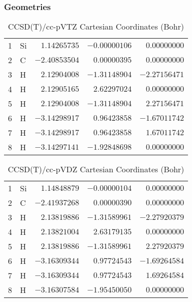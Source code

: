 \documentclass[10pt,oneside]{article}
\begin{document}
\clearpage

\subsection{\ \ \ }

\subsubsection*{Geometries}
\begin{table}[h!]
\centering
\caption{CCSD(T)/cc-pVTZ Cartesian Coordinates (Bohr)}
\begin{tabular}{llrrr}
1  & Si & $ 1.14265735$ & $-0.00000106$ & $ 0.00000000$ \\
2  & C  & $-2.40853504$ & $ 0.00000395$ & $ 0.00000000$ \\
3  & H  & $ 2.12904008$ & $-1.31148904$ & $-2.27156471$ \\
4  & H  & $ 2.12905165$ & $ 2.62297024$ & $ 0.00000000$ \\
5  & H  & $ 2.12904008$ & $-1.31148904$ & $ 2.27156471$ \\
6  & H  & $-3.14298917$ & $ 0.96423858$ & $-1.67011742$ \\
7  & H  & $-3.14298917$ & $ 0.96423858$ & $ 1.67011742$ \\
8  & H  & $-3.14297141$ & $-1.92848698$ & $ 0.00000000$ \\
\end{tabular}
\end{table}

\begin{table}[h!]
\centering
\caption{CCSD(T)/cc-pVDZ Cartesian Coordinates (Bohr)}
\begin{tabular}{llrrr}
1  & Si & $ 1.14848879$ & $-0.00000104$ & $ 0.00000000$ \\
2  & C  & $-2.41937268$ & $ 0.00000390$ & $ 0.00000000$ \\
3  & H  & $ 2.13819886$ & $-1.31589961$ & $-2.27920379$ \\
4  & H  & $ 2.13821004$ & $ 2.63179135$ & $ 0.00000000$ \\
5  & H  & $ 2.13819886$ & $-1.31589961$ & $ 2.27920379$ \\
6  & H  & $-3.16309344$ & $ 0.97724543$ & $-1.69264584$ \\
7  & H  & $-3.16309344$ & $ 0.97724543$ & $ 1.69264584$ \\
8  & H  & $-3.16307584$ & $-1.95450050$ & $ 0.00000000$ \\
\end{tabular}
\end{table}
\end{document}
